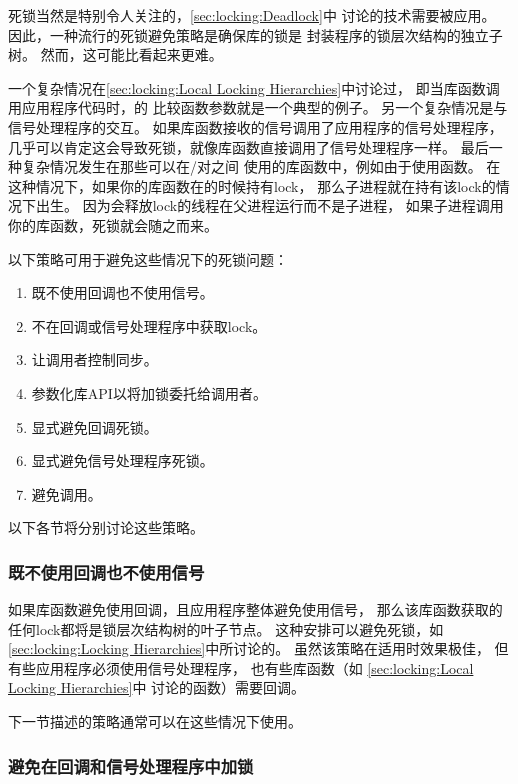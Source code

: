 死锁当然是特别令人关注的，\cref{sec:locking:Deadlock}中
讨论的技术需要被应用。
因此，一种流行的死锁避免策略是确保库的锁是
封装程序的锁层次结构的独立子树。
然而，这可能比看起来更难。

一个复杂情况在\cref{sec:locking:Local Locking Hierarchies}中讨论过，
即当库函数调用应用程序代码时，的
比较函数参数就是一个典型的例子。
另一个复杂情况是与信号处理程序的交互。
如果库函数接收的信号调用了应用程序的信号处理程序，
几乎可以肯定这会导致死锁，就像库函数直接调用了信号处理程序一样。
最后一种复杂情况发生在那些可以在/对之间
使用的库函数中，例如由于使用函数。
在这种情况下，如果你的库函数在的时候持有lock，
那么子进程就在持有该lock的情况下出生。
因为会释放lock的线程在父进程运行而不是子进程，
如果子进程调用你的库函数，死锁就会随之而来。

以下策略可用于避免这些情况下的死锁问题：

\begin{enumerate}
\item	既不使用回调也不使用信号。
\item	不在回调或信号处理程序中获取lock。
\item	让调用者控制同步。
\item	参数化库API以将加锁委托给调用者。
\item	显式避免回调死锁。
\item	显式避免信号处理程序死锁。
\item	避免调用。
\end{enumerate}

以下各节将分别讨论这些策略。

\subsubsection{既不使用回调也不使用信号}
\label{sec:locking:Use Neither Callbacks Nor Signals}

如果库函数避免使用回调，且应用程序整体避免使用信号，
那么该库函数获取的任何lock都将是锁层次结构树的叶子节点。
这种安排可以避免死锁，如
\cref{sec:locking:Locking Hierarchies}中所讨论的。
虽然该策略在适用时效果极佳，
但有些应用程序必须使用信号处理程序，
也有些库函数（如
\cref{sec:locking:Local Locking Hierarchies}中
讨论的函数）需要回调。

下一节描述的策略通常可以在这些情况下使用。

\subsubsection{避免在回调和信号处理程序中加锁}
\label{sec:locking:Avoid Locking in Callbacks and Signal Handlers}

